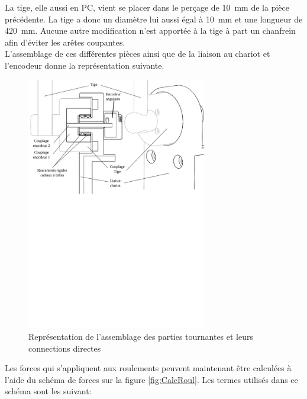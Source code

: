 La tige, elle aussi en \acrshort{PC}, vient se placer dans le perçage de 10~mm de la pièce précédente. La tige a donc un
diamètre lui aussi égal à 10~mm et une longueur de 420~mm. Aucune autre modification n'est apportée à la tige à part un chanfrein afin d'éviter
les arêtes coupantes.\\

L'assemblage de ces différentes pièces ainsi que de la liaison au chariot et l'encodeur donne la représentation suivante.

\begin{figure}[H]
    \centering
    \includegraphics[width = 0.7\textwidth]{assets/figures/AssemblagePartieTournante.svg}
    \caption{Représentation de l'assemblage des parties tournantes et leurs connections directes}
    \label{fig:AssPartieTour}
\end{figure}

Les forces qui s'appliquent aux roulements peuvent maintenant être calculées à l'aide du schéma de forces sur la figure \ref{fig:CalcRoul}.
Les termes utilisés dans ce schéma sont les suivant:

